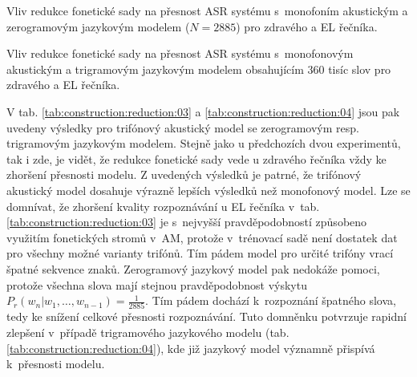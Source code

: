 \begin{table}[htpb]
  \centering
  \def\arraystretch{1.5}
  \caption[Vliv redukce na přesnost ASR s~mono. AM. a zerogram LM.]{Vliv redukce fonetické sady na přesnost ASR systému s~monofoním akustickým a zerogramovým jazykovým modelem ($N=2885$) pro zdravého a EL řečníka.}
  \label{tab:construction:reduction:01}
\end{table}

\begin{table}[htpb]
  \centering
  \def\arraystretch{1.5}
  \caption[Vliv redukce na přesnost ASR s~mono. AM. a 3-gram LM (N=360k).]{Vliv redukce fonetické sady na přesnost ASR systému s~monofonovým akustickým a trigramovým jazykovým modelem obsahujícím 360 tisíc slov pro zdravého a EL řečníka.}
  \label{tab:construction:reduction:02}
\end{table}


V tab. \ref{tab:construction:reduction:03} a \ref{tab:construction:reduction:04} jsou pak uvedeny výsledky pro trifónový akustický model se zerogramovým resp. trigramovým jazykovým modelem.
Stejně jako u předchozích dvou experimentů, tak i zde, je vidět, že redukce fonetické sady vede u zdravého řečníka vždy ke zhoršení přesnosti modelu.
Z uvedených výsledků je patrné, že trifónový akustický model dosahuje výrazně lepších výsledků než monofonový model.
Lze se domnívat, že zhoršení kvality rozpoznávání u EL řečníka v~tab. \ref{tab:construction:reduction:03} je s~nejvyšší pravděpodobností způsobeno využitím fonetických stromů v~AM, protože v~trénovací sadě není dostatek dat pro všechny možné varianty trifónů.
Tím pádem model pro určité trifóny vrací špatné sekvence znaků.
Zerogramový jazykový model pak nedokáže pomoci, protože všechna slova mají stejnou pravděpodobnost výskytu $P_r(w_n|w_1,\dots,w_{n-1}) = \frac{1}{2885}$.
Tím pádem dochází  k~rozpoznání špatného slova, tedy ke snížení celkové přesnosti rozpoznávání.
Tuto domněnku potvrzuje rapidní zlepšení v~případě trigramového jazykového modelu (tab. \ref{tab:construction:reduction:04}), kde již jazykový model významně přispívá  k~přesnosti modelu.

